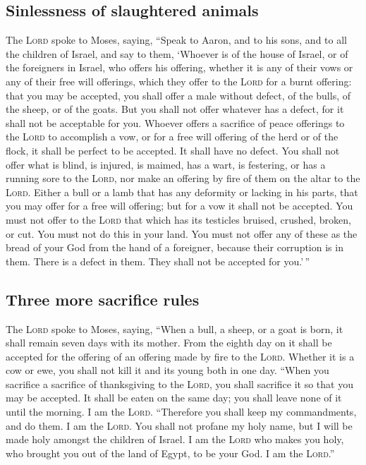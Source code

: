 \hypertarget{sinlessness-of-slaughtered-animals}{%
\subsection{Sinlessness of slaughtered
animals}\label{sinlessness-of-slaughtered-animals}}

 The \textsc{Lord} spoke to Moses, saying,
 ``Speak to Aaron, and to his sons, and to all the
children of Israel, and say to them, `Whoever is of the house of Israel,
or of the foreigners in Israel, who offers his offering, whether it is
any of their vows or any of their free will offerings, which they offer
to the \textsc{Lord} for a burnt offering:  that you may
be accepted, you shall offer a male without defect, of the bulls, of the
sheep, or of the goats.  But you shall not offer whatever
has a defect, for it shall not be acceptable for you. 
Whoever offers a sacrifice of peace offerings to the \textsc{Lord} to
accomplish a vow, or for a free will offering of the herd or of the
flock, it shall be perfect to be accepted. It shall have no defect.
 You shall not offer what is blind, is injured, is
maimed, has a wart, is festering, or has a running sore to the
\textsc{Lord}, nor make an offering by fire of them on the altar to the
\textsc{Lord}.  Either a bull or a lamb that has any
deformity or lacking in his parts, that you may offer for a free will
offering; but for a vow it shall not be accepted.  You
must not offer to the \textsc{Lord} that which has its testicles
bruised, crushed, broken, or cut. You must not do this in your land.
 You must not offer any of these as the bread of your God
from the hand of a foreigner, because their corruption is in them. There
is a defect in them. They shall not be accepted for you.'\,''

\hypertarget{three-more-sacrifice-rules}{%
\subsection{Three more sacrifice
rules}\label{three-more-sacrifice-rules}}

 The \textsc{Lord} spoke to Moses, saying,
 ``When a bull, a sheep, or a goat is born, it shall
remain seven days with its mother. From the eighth day on it shall be
accepted for the offering of an offering made by fire to the
\textsc{Lord}.  Whether it is a cow or ewe, you shall not
kill it and its young both in one day.  ``When you
sacrifice a sacrifice of thanksgiving to the \textsc{Lord}, you shall
sacrifice it so that you may be accepted.  It shall be
eaten on the same day; you shall leave none of it until the morning. I
am the \textsc{Lord}.  ``Therefore you shall keep my
commandments, and do them. I am the \textsc{Lord}.  You
shall not profane my holy name, but I will be made holy amongst the
children of Israel. I am the \textsc{Lord} who makes you holy,
 who brought you out of the land of Egypt, to be your
God. I am the \textsc{Lord}.''

